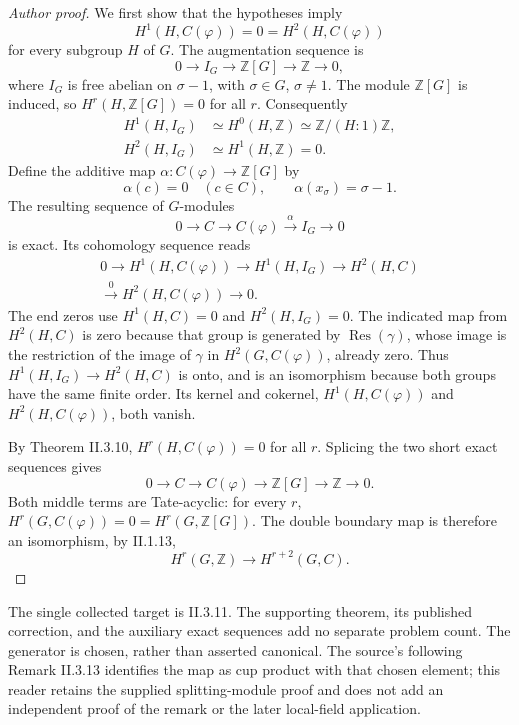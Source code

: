 \documentclass[11pt]{article}
\newcommand{\Res}{\operatorname{Res}}
\begin{document}
\begin{proof}[Author proof]
We first show that the hypotheses imply
\[
 H^1(H,C(\varphi))=0=H^2(H,C(\varphi))
\]
for every subgroup $H$ of $G$. The augmentation sequence is
\[
 0\longrightarrow I_G\longrightarrow\mathbb Z[G]
  \longrightarrow\mathbb Z\longrightarrow0,
\]
where $I_G$ is free abelian on $\sigma-1$, with $\sigma\in G$, $\sigma\ne1$.
The module $\mathbb Z[G]$ is induced, so $H^r(H,\mathbb Z[G])=0$ for all $r$.
Consequently
\begin{align*}
 H^1(H,I_G)&\simeq H^0(H,\mathbb Z)\simeq\mathbb Z/(H:1)\mathbb Z,\\
 H^2(H,I_G)&\simeq H^1(H,\mathbb Z)=0.
\end{align*}
Define the additive map $\alpha:C(\varphi)\longrightarrow\mathbb Z[G]$ by
\[
 \alpha(c)=0\quad(c\in C),\qquad\alpha(x_\sigma)=\sigma-1.
\]
The resulting sequence of $G$-modules
\[
 0\longrightarrow C\longrightarrow C(\varphi)
   \xrightarrow{\alpha}I_G\longrightarrow0
\]
is exact. Its cohomology sequence reads
\[
\begin{split}
0\longrightarrow H^1(H,C(\varphi))\longrightarrow H^1(H,I_G)
 \longrightarrow H^2(H,C)\\
 \xrightarrow{\,0\,}H^2(H,C(\varphi))\longrightarrow0.
\end{split}
\]
The end zeros use $H^1(H,C)=0$ and $H^2(H,I_G)=0$.
The indicated map from $H^2(H,C)$ is zero because that group is generated
by $\Res(\gamma)$, whose image is the restriction of the image of $\gamma$
in $H^2(G,C(\varphi))$, already zero.
Thus $H^1(H,I_G)\longrightarrow H^2(H,C)$ is onto, and is an isomorphism
because both groups have the same finite order. Its kernel and cokernel,
$H^1(H,C(\varphi))$ and $H^2(H,C(\varphi))$, both vanish.

By Theorem II.3.10, $H^r(H,C(\varphi))=0$ for all $r$.
Splicing the two short exact sequences gives
\[
 0\longrightarrow C\longrightarrow C(\varphi)\longrightarrow\mathbb Z[G]
   \longrightarrow\mathbb Z\longrightarrow0. \tag{24}
\]
Both middle terms are Tate-acyclic: for every $r$,
$H^r(G,C(\varphi))=0=H^r(G,\mathbb Z[G])$.
The double boundary map is therefore an isomorphism, by II.1.13,
\[
 H^r(G,\mathbb Z)\longrightarrow H^{r+2}(G,C).
\]
\end{proof}

\medskip
\noindent\small
The single collected target is II.3.11. The supporting theorem, its published
correction, and the auxiliary exact sequences add no separate problem count.
The generator is chosen, rather than asserted canonical. The source's following
Remark II.3.13 identifies the map as cup product with that chosen element;
this reader retains the supplied splitting-module proof and does not add an
independent proof of the remark or the later local-field application.
\end{document}
